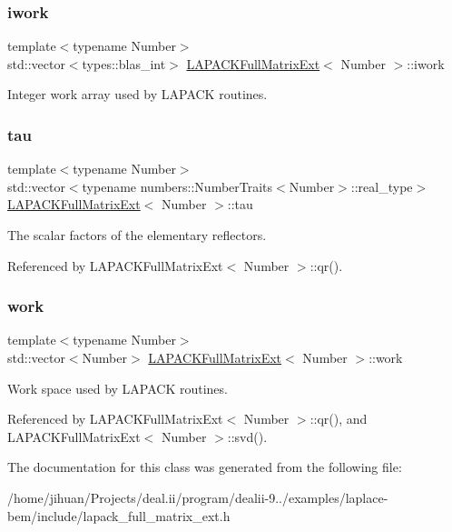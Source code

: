 \subsubsection{\texorpdfstring{iwork}{iwork}}
{\footnotesize\ttfamily template$<$typename Number$>$ \\
std\+::vector$<$types\+::blas\+\_\+int$>$ \hyperlink{classLAPACKFullMatrixExt}{L\+A\+P\+A\+C\+K\+Full\+Matrix\+Ext}$<$ Number $>$\+::iwork\hspace{0.3cm}{\ttfamily [private]}}

Integer work array used by L\+A\+P\+A\+CK routines. \mbox{\label{classLAPACKFullMatrixExt_a91fb784892cbe9d24ad2062fbf642635}} 
\subsubsection{\texorpdfstring{tau}{tau}}
{\footnotesize\ttfamily template$<$typename Number$>$ \\
std\+::vector$<$typename numbers\+::\+Number\+Traits$<$Number$>$\+::real\+\_\+type$>$ \hyperlink{classLAPACKFullMatrixExt}{L\+A\+P\+A\+C\+K\+Full\+Matrix\+Ext}$<$ Number $>$\+::tau\hspace{0.3cm}{\ttfamily [private]}}

The scalar factors of the elementary reflectors. 

Referenced by L\+A\+P\+A\+C\+K\+Full\+Matrix\+Ext$<$ Number $>$\+::qr().

\mbox{\label{classLAPACKFullMatrixExt_a971d29c6d7664fca553b6ba377519946}} 
\subsubsection{\texorpdfstring{work}{work}}
{\footnotesize\ttfamily template$<$typename Number$>$ \\
std\+::vector$<$Number$>$ \hyperlink{classLAPACKFullMatrixExt}{L\+A\+P\+A\+C\+K\+Full\+Matrix\+Ext}$<$ Number $>$\+::work\hspace{0.3cm}{\ttfamily [private]}}

Work space used by L\+A\+P\+A\+CK routines. 

Referenced by L\+A\+P\+A\+C\+K\+Full\+Matrix\+Ext$<$ Number $>$\+::qr(), and L\+A\+P\+A\+C\+K\+Full\+Matrix\+Ext$<$ Number $>$\+::svd().



The documentation for this class was generated from the following file\+:\begin{DoxyCompactItemize}
\item 
/home/jihuan/\+Projects/deal.\+ii/program/dealii-\/9../examples/laplace-\/bem/include/lapack\+\_\+full\+\_\+matrix\+\_\+ext.\+h\end{DoxyCompactItemize}
